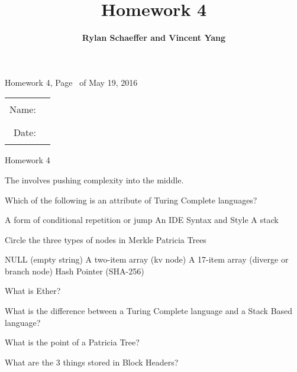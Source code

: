 \documentclass{exam}
\title{\bf Homework 4}
\author{\bf Rylan Schaeffer and Vincent Yang}
\begin{document}
\pagestyle{headandfoot}
\runningheadrule
{}
              {Homework 4, Page \thepage\ of \numpages}
              {May 19, 2016}
\firstpagefooter{}{}{}
\runningfooter{}{}{}
\begin{tabular}{rl}
Name:  & \rule{0.25\linewidth}{\linethickness} \\ 
Date:  & \rule{0.25\linewidth}{\linethickness} \\ 
\end{tabular}
\vspace{5mm}

\begin{center} 
  \Large Homework 4
\end{center} 

\begin{center}
\end{center}

\addpoints
\begin{center}
\gradetable[h][questions]
\end{center}


\begin{questions}

  \question[5] The  involves pushing complexity into the middle.

  \question[5]
  Which of the following is an attribute of Turing Complete languages?
  \begin{choices}
    \choice A form of conditional repetition or jump
    \choice An IDE
    \choice Syntax and Style
    \choice A stack
  \end{choices}

  \question[5]
  Circle the three types of nodes in Merkle Patricia Trees
  \begin{choices}
    \choice NULL (empty string) 
    \choice A two-item array (kv node)
    \choice A 17-item array (diverge or branch node)
    \choice Hash Pointer (SHA-256)
  \end{choices}

  \question[25] What is Ether?
  \fillwithlines{1.8in}

  \question[20] What is the difference between a Turing Complete language and a Stack Based language?
  \fillwithlines{1.8in}

  \question[20] What is the point of a Patricia Tree?
  \fillwithlines{2.2in}

  \question[20] What are the 3 things stored in Block Headers?
  \fillwithlines{2.2in}
\end{questions}
\end{document}
